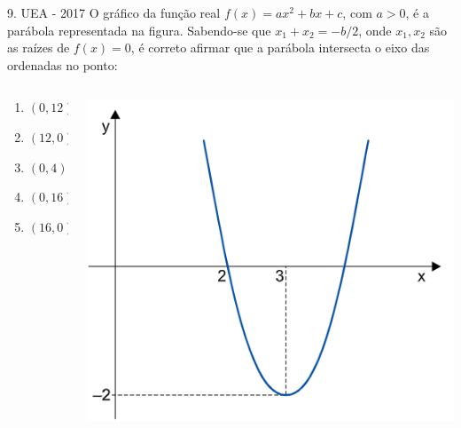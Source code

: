 \documentclass[11pt]{beamer}
\begin{document}
\begin{frame}{9. UEA - 2017}
    O gráfico da função real $f(x)=ax^{2}+ bx + c$, com $a > 0$, é a parábola representada na figura. Sabendo-se que $x_{1}+x_{2}= -{b}/2$, onde $ x_{1}, x_ {2}$ são as raízes de $f(x) = 0$, é correto afirmar que a parábola intersecta o eixo das ordenadas no ponto:

    \begin{columns}
        \begin{column}{0.4\textwidth}
            \begin{enumerate}[a]
                \item $(0,12)$ 
                \item $(12,0)$
                \item $(0,4)$ 
                \item $(0,16)$ %
                \item $(16,0)$
            \end{enumerate}
        \end{column}

        \begin{column}{0.5\textwidth}
            \centering
            \includegraphics[width=0.8\linewidth]{imagens/uea-macro-2017(2).png}
        \end{column}
    \end{columns}
    
\end{frame}
\end{document}
